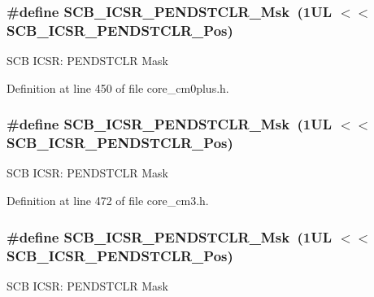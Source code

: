 \subsubsection[{\texorpdfstring{S\+C\+B\+\_\+\+I\+C\+S\+R\+\_\+\+P\+E\+N\+D\+S\+T\+C\+L\+R\+\_\+\+Msk}{SCB_ICSR_PENDSTCLR_Msk}}]{\setlength{\rightskip}{0pt plus 5cm}\#define S\+C\+B\+\_\+\+I\+C\+S\+R\+\_\+\+P\+E\+N\+D\+S\+T\+C\+L\+R\+\_\+\+Msk~(1\+U\+L $<$$<$ S\+C\+B\+\_\+\+I\+C\+S\+R\+\_\+\+P\+E\+N\+D\+S\+T\+C\+L\+R\+\_\+\+Pos)}\hypertarget{group___c_m_s_i_s___s_c_b_gab241827d2a793269d8cd99b9b28c2157}{}\label{group___c_m_s_i_s___s_c_b_gab241827d2a793269d8cd99b9b28c2157}
S\+CB I\+C\+SR\+: P\+E\+N\+D\+S\+T\+C\+LR Mask 

Definition at line 450 of file core\+\_\+cm0plus.\+h.

\subsubsection[{\texorpdfstring{S\+C\+B\+\_\+\+I\+C\+S\+R\+\_\+\+P\+E\+N\+D\+S\+T\+C\+L\+R\+\_\+\+Msk}{SCB_ICSR_PENDSTCLR_Msk}}]{\setlength{\rightskip}{0pt plus 5cm}\#define S\+C\+B\+\_\+\+I\+C\+S\+R\+\_\+\+P\+E\+N\+D\+S\+T\+C\+L\+R\+\_\+\+Msk~(1\+U\+L $<$$<$ S\+C\+B\+\_\+\+I\+C\+S\+R\+\_\+\+P\+E\+N\+D\+S\+T\+C\+L\+R\+\_\+\+Pos)}\hypertarget{group___c_m_s_i_s___s_c_b_gab241827d2a793269d8cd99b9b28c2157}{}\label{group___c_m_s_i_s___s_c_b_gab241827d2a793269d8cd99b9b28c2157}
S\+CB I\+C\+SR\+: P\+E\+N\+D\+S\+T\+C\+LR Mask 

Definition at line 472 of file core\+\_\+cm3.\+h.

\subsubsection[{\texorpdfstring{S\+C\+B\+\_\+\+I\+C\+S\+R\+\_\+\+P\+E\+N\+D\+S\+T\+C\+L\+R\+\_\+\+Msk}{SCB_ICSR_PENDSTCLR_Msk}}]{\setlength{\rightskip}{0pt plus 5cm}\#define S\+C\+B\+\_\+\+I\+C\+S\+R\+\_\+\+P\+E\+N\+D\+S\+T\+C\+L\+R\+\_\+\+Msk~(1\+U\+L $<$$<$ S\+C\+B\+\_\+\+I\+C\+S\+R\+\_\+\+P\+E\+N\+D\+S\+T\+C\+L\+R\+\_\+\+Pos)}\hypertarget{group___c_m_s_i_s___s_c_b_gab241827d2a793269d8cd99b9b28c2157}{}\label{group___c_m_s_i_s___s_c_b_gab241827d2a793269d8cd99b9b28c2157}
S\+CB I\+C\+SR\+: P\+E\+N\+D\+S\+T\+C\+LR Mask 

